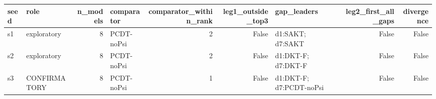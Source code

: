 \begin{tabular}{llrlrrlrr}
\toprule
seed & role & n\_models & comparator & comparator\_within\_rank & leg1\_outside\_top3 & gap\_leaders & leg2\_first\_all\_gaps & divergence \\
\midrule
s1 & exploratory & 8 & PCDT-noPsi & 2 & False & d1:SAKT; d7:SAKT & False & False \\
s2 & exploratory & 8 & PCDT-noPsi & 2 & False & d1:DKT-F; d7:DKT-F & False & False \\
s3 & CONFIRMATORY & 8 & PCDT-noPsi & 1 & False & d1:DKT-F; d7:PCDT-noPsi & False & False \\
\bottomrule
\end{tabular}
